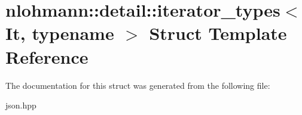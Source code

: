 \hypertarget{structnlohmann_1_1detail_1_1iterator__types}{}\section{nlohmann\+:\+:detail\+:\+:iterator\+\_\+types$<$ It, typename $>$ Struct Template Reference}
\label{structnlohmann_1_1detail_1_1iterator__types}


The documentation for this struct was generated from the following file\+:\begin{DoxyCompactItemize}
\item 
json.\+hpp\end{DoxyCompactItemize}

